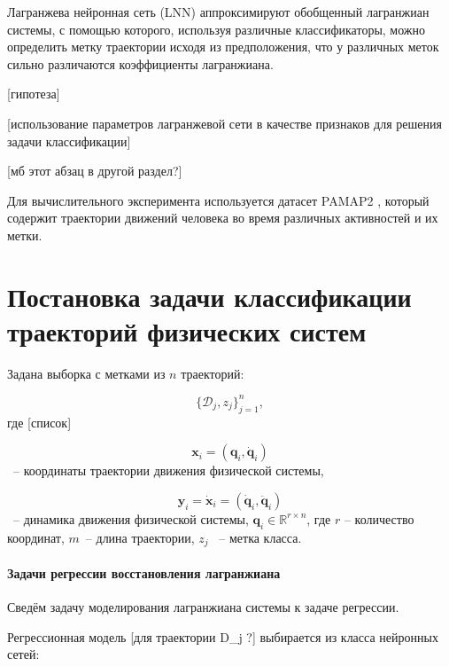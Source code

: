 \documentclass[12pt, twoside]{article}
\begin{document}
    Лагранжева нейронная сеть (LNN) \cite{cranmer2020lagrangian} аппроксимируют обобщенный лагранжиан системы, с помощью которого, используя различные классификаторы, можно определить метку траектории исходя из предположения, что у различных меток сильно различаются коэффициенты лагранжиана.

    [гипотеза]

    [использование параметров лагранжевой сети в качестве признаков для решения задачи классификации]


    [мб этот абзац в другой раздел?]
    
    Для вычислительного эксперимента используется датасет PAMAP2 \cite{PAMAP2}, который содержит траектории движений человека во время различных активностей и их метки.

\newpage
    
\section{Постановка задачи классификации траекторий физических систем}

Задана выборка с метками из $n$ траекторий: 

    $$\{ \mathcal{D}_j, z_j\}_{j=1}^n,$$ 
    где  [список]



    
    $$\mathbf{x}_i = (\mathbf{q}_i, \mathbf{\dot{q}}_i)$$
    ~-- координаты траектории движения физической системы, 
    
    $$\mathbf{{y}}_i = \mathbf{\dot{x}}_i = (\mathbf{\dot{q}}_i, \mathbf{\ddot{q}}_i)$$
    ~-- динамика движения физической системы, $\mathbf{q}_i \in \mathbb{R}^{r \times n}$, где $r$ -- количество координат, $m$~-- длина траектории, $z_j$ ~-- метка класса.

\paragraph{Задачи регрессии восстановления лагранжиана}

    Сведём задачу моделирования лагранжиана системы к задаче регрессии. 

    Регрессионная модель [для траектории D\_j ?] выбирается из класса нейронных сетей:
\end{document}
